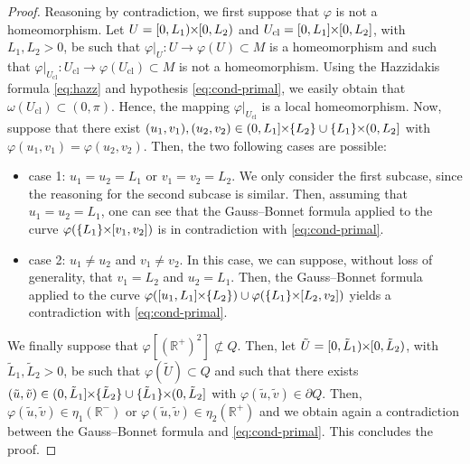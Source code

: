 \documentclass{article}
\newcommand{\PLH}{{\mkern-1mu\times\mkern-1mu}}
\newcommand{\Times}{\PLH}
\newcommand{\R}{\mathbb{R}}
\newcommand{\surf}{M}
\newcommand{\sect}{Q}
\theoremstyle{remark}
\theoremstyle{prpart}
\begin{document}
\begin{proof}
Reasoning by contradiction, we first suppose that $\varphi$ is not a homeomorphism. Let $U = [0,L_1)\Times [0,L_2)$ and $U_{\mathrm{cl}} = [0,L_1]\Times [0,L_2]$, with $L_1,L_2>0$,  be such that $\varphi\big|_{U} : U\to \varphi(U)\subset \surf$ is a homeomorphism and such that $\varphi\big|_{U_{\mathrm{cl}}}: U_{\mathrm{cl}}\to\varphi(U_{\mathrm{cl}})\subset\surf$ is not a homeomorphism. Using the Hazzidakis formula \eqref{eq:hazz} and hypothesis \eqref{eq:cond-primal}, we easily obtain that $\omega(U_\mathrm{cl})\subset (0,\pi)$. Hence, the mapping $\varphi\big|_{U_{\mathrm{cl}}}$ is a local homeomorphism.
Now, suppose that there exist $(u_1,v_1),(u_2,v_2)\in(0,L_1]\Times\{L_2\}\cup\{L_1\}\Times(0,L_2]$ with $\varphi(u_1,v_1) = \varphi(u_2,v_2)$. Then, the two following cases are possible:
\begin{itemize}
\item case 1: $u_1=u_2=L_1$ or $v_1=v_2=L_2$. We only consider the first subcase, since the reasoning for the second subcase is similar. Then, assuming that $u_1=u_2=L_1$, one can see that the Gauss--Bonnet formula applied to the curve $\varphi(\{L_1\}\Times[v_1,v_2])$ is in contradiction with \eqref{eq:cond-primal}.
\item case 2: $u_1\neq u_2$ and $v_1\neq v_2$. In this case, we can suppose, without loss of generality, that $v_1=L_2$ and $u_2=L_1$. Then, the Gauss--Bonnet formula applied to the curve $\varphi([u_1,L_1]\Times\{L_2\})\cup\varphi(\{L_1\}\Times[L_2,v_2])$ yields a contradiction with \eqref{eq:cond-primal}.
\end{itemize}
We finally suppose that $\varphi[(\R^+)^2]\not\subset \sect$. Then, let $\tilde U = [0,\tilde L_1)\Times [0,\tilde L_2)$, with $\tilde L_1,\tilde L_2>0$, be such that $\varphi(\tilde U)\subset\sect$ and such that there exists $(\tilde u,\tilde v)\in(0,\tilde L_1]\Times\{\tilde L_2\}\cup\{\tilde L_1\}\Times(0,\tilde L_2]$ with $\varphi(\tilde u,\tilde v)\in\partial \sect$. Then, $\varphi(\tilde u, \tilde v)\in\eta_1(\R^-)$ or $\varphi(\tilde u, \tilde v)\in\eta_2(\R^+)$ and we obtain again a contradiction between the Gauss--Bonnet formula and \eqref{eq:cond-primal}. This concludes the proof.
\end{proof} 
\end{document}
